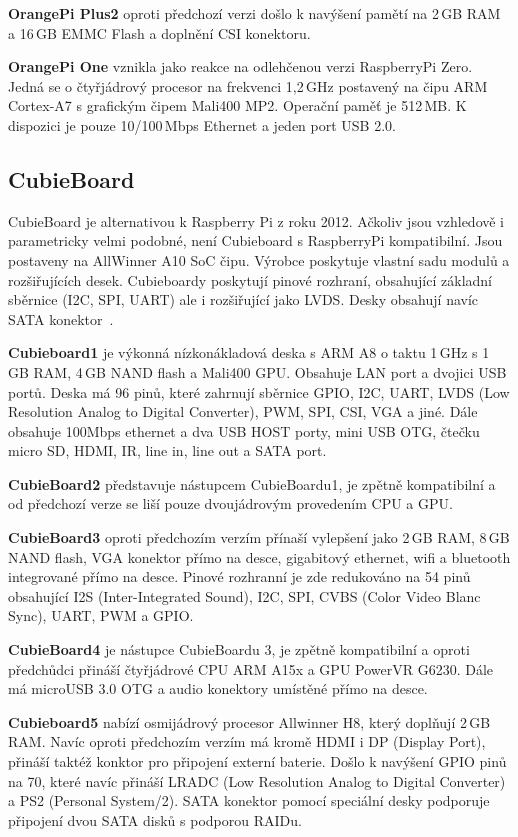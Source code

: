 		\textbf{OrangePi Plus2} oproti předchozí verzi došlo k navýšení pamětí na 2\,GB RAM a 16\,GB EMMC Flash a doplnění CSI konektoru.
		
		\textbf{OrangePi One} vznikla jako reakce na odlehčenou verzi RaspberryPi Zero. Jedná se o čtyřjádrový procesor na frekvenci 1,2\,GHz postavený na čipu ARM Cortex-A7 s grafickým čipem Mali400 MP2. Operační paměť je 512\,MB. K dispozici je pouze 10/100\,Mbps Ethernet a jeden port USB 2.0.


	\subsection{CubieBoard}
	\label{KapCubie}
			CubieBoard je alternativou k Raspberry Pi z roku 2012. Ačkoliv jsou vzhledově i parametricky velmi podobné, není Cubieboard s RaspberryPi kompatibilní. Jsou postaveny na AllWinner A10 SoC čipu. Výrobce poskytuje vlastní sadu modulů a rozšiřujících desek. Cubieboardy poskytují pinové rozhraní, obsahující základní sběrnice (I2C, SPI, UART) ale i rozšiřující jako LVDS. Desky obsahují navíc SATA konektor~\cite{CubieBoards}.
	
	\textbf{Cubieboard1} je výkonná nízkonákladová deska s ARM A8 o taktu 1\,GHz s 1\,GB RAM, 4\,GB NAND flash a Mali400 GPU. Obsahuje LAN port a dvojici USB portů. Deska má 96 pinů, které zahrnují sběrnice GPIO, I2C, UART, LVDS (Low Resolution Analog to Digital Converter), PWM, SPI, CSI, VGA a jiné. Dále obsahuje 100Mbps ethernet a dva USB HOST porty, mini USB OTG, čtečku micro SD, HDMI, IR, line in, line out a SATA port.
	
	\textbf{CubieBoard2} představuje nástupcem CubieBoardu1, je zpětně kompatibilní a od předchozí verze se liší pouze dvoujádrovým provedením CPU a GPU.
		
	\textbf{CubieBoard3} oproti předchozím verzím přínaší vylepšení jako 2\,GB RAM, 8\,GB NAND flash, VGA konektor přímo na desce, gigabitový ethernet, wifi a bluetooth integrované přímo na desce. Pinové rozhranní je zde redukováno na 54 pinů obsahující I2S (Inter-Integrated Sound), I2C, SPI, CVBS (Color Video Blanc Sync), UART, PWM a GPIO.
	
		\textbf{CubieBoard4} je nástupce CubieBoardu 3, je zpětně kompatibilní a oproti předchůdci přináší čtyřjádrové CPU ARM A15x a GPU PowerVR G6230. Dále má microUSB 3.0 OTG a audio konektory umístěné přímo na desce.
		
			\textbf{Cubieboard5 }nabízí osmijádrový procesor Allwinner H8, který doplňují 2\,GB RAM. Navíc oproti předchozím verzím má kromě HDMI i DP (Display Port), přináší taktéž konktor pro připojení externí baterie. Došlo k navýšení GPIO pinů na 70, které navíc přináší LRADC (Low Resolution Analog to Digital Converter) a PS2 (Personal System/2). SATA konektor pomocí speciální desky podporuje připojení dvou SATA disků s podporou RAIDu.
		
